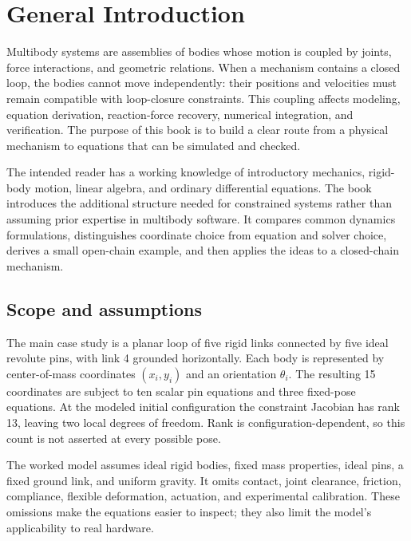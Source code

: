 \chapter*{General Introduction}

\label{chap:introduction}

Multibody systems are assemblies of bodies whose motion is coupled by joints, force interactions, and geometric relations. When a mechanism contains a closed loop, the bodies cannot move independently: their positions and velocities must remain compatible with loop-closure constraints. This coupling affects modeling, equation derivation, reaction-force recovery, numerical integration, and verification. The purpose of this book is to build a clear route from a physical mechanism to equations that can be simulated and checked.

The intended reader has a working knowledge of introductory mechanics, rigid-body motion, linear algebra, and ordinary differential equations. The book introduces the additional structure needed for constrained systems rather than assuming prior expertise in multibody software. It compares common dynamics formulations, distinguishes coordinate choice from equation and solver choice, derives a small open-chain example, and then applies the ideas to a closed-chain mechanism.

\section*{Scope and assumptions}
The main case study is a planar loop of five rigid links connected by five ideal revolute pins, with link 4 grounded horizontally. Each body is represented by center-of-mass coordinates \((x_i,y_i)\) and an orientation \(\theta_i\). The resulting 15 coordinates are subject to ten scalar pin equations and three fixed-pose equations. At the modeled initial configuration the constraint Jacobian has rank 13, leaving two local degrees of freedom. Rank is configuration-dependent, so this count is not asserted at every possible pose.

The worked model assumes ideal rigid bodies, fixed mass properties, ideal pins, a fixed ground link, and uniform gravity. It omits contact, joint clearance, friction, compliance, flexible deformation, actuation, and experimental calibration. These omissions make the equations easier to inspect; they also limit the model's applicability to real hardware.

